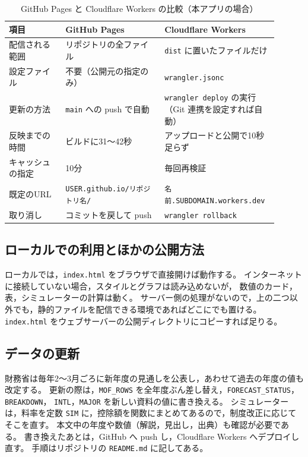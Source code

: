 \documentclass[paper=a4,fontsize=10pt]{jlreq}
\newcommand{\code}[1]{\texttt{#1}}
\begin{document}
\begin{table}[htbp]
  \centering
  \caption{GitHub Pages と Cloudflare Workers の比較（本アプリの場合）}\label{tab:hosting}
  {\small
  \begin{tabular}{p{0.20\linewidth}p{0.35\linewidth}p{0.35\linewidth}}
    \toprule
    項目 & GitHub Pages & Cloudflare Workers \\
    \midrule
    配信される範囲 & リポジトリの全ファイル & \code{dist} に置いたファイルだけ \\
    設定ファイル & 不要（公開元の指定のみ） & \code{wrangler.jsonc} \\
    更新の方法 & \code{main} への push で自動 & \code{wrangler deploy} の実行（Git 連携を設定すれば自動） \\
    反映までの時間 & ビルドに31〜42秒 & アップロードと公開で10秒足らず \\
    キャッシュの指定 & 10分 & 毎回再検証 \\
    既定のURL & \code{USER.github.io/リポジトリ名/} & \code{名前.SUBDOMAIN.workers.dev} \\
    取り消し & コミットを戻して push & \code{wrangler rollback} \\
    \bottomrule
  \end{tabular}}
\end{table}

\subsection{ローカルでの利用とほかの公開方法}

ローカルでは，\code{index.html} をブラウザで直接開けば動作する。
インターネットに接続していない場合，スタイルとグラフは読み込めないが，
数値のカード，表，シミュレーターの計算は動く。
サーバー側の処理がないので，上の二つ以外でも，静的ファイルを配信できる環境であればどこにでも置ける。
\code{index.html} をウェブサーバーの公開ディレクトリにコピーすれば足りる。

\subsection{データの更新}

財務省は毎年2〜3月ごろに新年度の見通しを公表し，あわせて過去の年度の値も改定する。
更新の際は，\code{MOF\_ROWS} を全年度ぶん差し替え，\code{FORECAST\_STATUS}，\code{BREAKDOWN}，
\code{INTL}，\code{MAJOR} を新しい資料の値に書き換える。
シミュレーターは，料率を定数 \code{SIM} に，控除額を関数にまとめてあるので，制度改正に応じてそこを直す。
本文中の年度や数値（解説，見出し，出典）も確認が必要である。
書き換えたあとは，GitHub へ push し，Cloudflare Workers へデプロイし直す。
手順はリポジトリの \code{README.md} に記してある。
\end{document}
